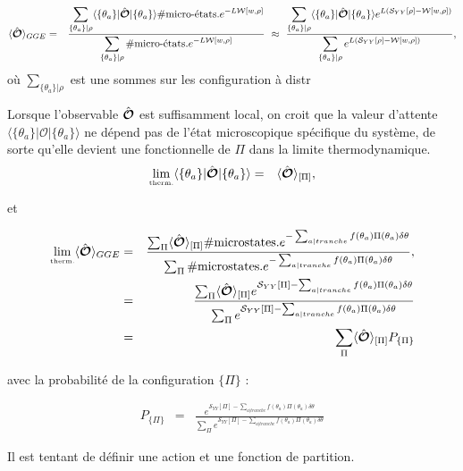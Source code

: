 	
	
\begin{eqnarray}
	\langle \hat{\bm{\mathcal{O}}} \rangle_{GGE} & =  & \frac{  \displaystyle \sum_{\{\theta_a \} \vert \rho } \langle  \{ \theta_a\}  \vert   \hat{\bm{\mathcal{O}}} \vert \{ \theta_a\} \rangle \# \mbox{micro-états.} e^{- L\mathcal{W}[w,\rho]    }}{ \displaystyle \sum_{\{\theta_a \} \vert \rho }  \# \mbox{micro-états.}e^{- L\mathcal{W}[w,\rho] } } ~ \approx  ~ \frac{  \displaystyle \sum_{\{\theta_a \} \vert \rho } \langle  \{ \theta_a\}  \vert   \hat{\bm{\mathcal{O}}} \vert \{ \theta_a\} \rangle e^{L(\mathcal{S}_{YY}[\rho] -  \mathcal{W}[w,\rho]) }}{ \displaystyle \sum_{\{\theta_a \} \vert \rho } e^{L(\mathcal{S}_{YY}[\rho] -  \mathcal{W}[w,\rho]) } },
\end{eqnarray}
où $ \sum_{\{\theta_a \} \vert \rho }$ est une sommes sur les configuration à distr
	
Lorsque l'observable $\hat{\bm{\mathcal{O}}}$ est suffisamment local, on croit que la valeur d'attente $\langle  \{ \theta_a\}  \vert   \mathcal{O} \vert \{ \theta_a\} \rangle$ ne dépend pas de l'état microscopique spécifique du système, de sorte qu'elle devient une fonctionnelle de $\Pi$ dans la limite thermodynamique.
\begin{eqnarray}
	\underset{\mbox{\tiny therm.}}{\lim} \langle  \{ \theta_a\}  \vert   \hat{\bm{\mathcal{O}}} \vert \{ \theta_a\} \rangle & = & \langle \hat{\bm{\mathcal{O}}}\rangle_{[\Pi]},
\end{eqnarray}
	
	et 
	
	\begin{eqnarray}
		\underset{\mbox{\tiny therm.}}{\lim} \langle \hat{\bm{\mathcal{O}}} \rangle_{GGE} & =  & \frac{ \sum_{\Pi} \langle \hat{\bm{\mathcal{O}}}\rangle_{[\Pi]} \# \mbox{microstates.} e^{- \sum_{a \vert tranche} f(\theta_a) \Pi ( \theta_a )  \delta \theta}    }{ \sum_{\Pi} \# \mbox{microstates.}  e^{- \sum_{a \vert tranche }  f(\theta_a) \Pi ( \theta_a ) \delta \theta } },\\
		& = & \frac{ \sum_{\Pi} \langle \hat{\bm{\mathcal{O}}}\rangle_{[\Pi]}  e^{ \mathcal{S}_{YY}[\Pi]- \sum_{a \vert tranche} f(\theta_a) \Pi ( \theta_a )  \delta \theta}    }{ \sum_{\Pi}  e^{\mathcal{S}_{YY}[\Pi] - \sum_{a \vert tranche }  f(\theta_a) \Pi ( \theta_a ) \delta \theta } }\\
		& = &  \sum_{\Pi} \langle \hat{\bm{\mathcal{O}}}\rangle_{[\Pi]} P_{\{\Pi\}}
	\end{eqnarray}
	
	avec la probabilité de la configuration $\{ \Pi \}$  : 
	
	\begin{eqnarray}
		P_{\{\Pi\}} & = & \frac{e^{\mathcal{S}_{YY}[\Pi] - \sum_{a \vert tranche }  f(\theta_a) \Pi ( \theta_a ) \delta \theta }}{ \sum_{\Pi}  e^{\mathcal{S}_{YY}[\Pi] - \sum_{a \vert tranche }  f(\theta_a) \Pi ( \theta_a ) \delta \theta } }
	\end{eqnarray}
	
	Il est tentant de définir une action  et une fonction de partition.